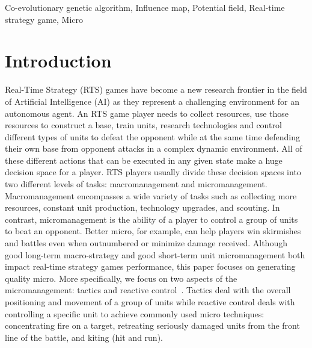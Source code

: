 \documentclass[conference,10pt]{IEEEtran}
\begin{document}
%
\begin{IEEEkeywords}
Co-evolutionary genetic algorithm, Influence map, Potential field, Real-time strategy game, Micro
\end{IEEEkeywords}
\vspace{-5pt}
%  
%
%
\section{Introduction}
\label{SectionIntroduction}

Real-Time Strategy (RTS) games have become a new research frontier in
the field of Artificial Intelligence (AI) as they represent a
challenging environment for an autonomous agent. An RTS game player
needs to collect resources, use those resources to construct a base,
train units, research technologies and control different types of
units to defeat the opponent while at the same time defending their
own base from opponent attacks in a complex dynamic environment. All
of these different actions that can be executed in any given state
make a huge decision space for a player. RTS players usually divide
these decision spaces into two different levels of tasks:
macromanagement and micromanagement. Macromanagement encompasses a
wide variety of tasks such as collecting more resources, constant unit
production, technology upgrades, and scouting. In contrast,
micromanagement is the ability of a player to control a group of units
to beat an opponent. Better micro, for example, can help players win
skirmishes and battles even when outnumbered or minimize damage
received. Although good long-term macro-strategy and good short-term
unit micromanagement both impact real-time strategy games performance,
this paper focuses on generating quality micro.  More specifically, we
focus on two aspects of the micromanagement: tactics and reactive
control~\cite{ASORSGARACIS13}. Tactics deal with the overall
positioning and movement of a group of units while reactive control
deals with controlling a specific unit to achieve commonly used micro
techniques: concentrating fire on a target, retreating seriously
damaged units from the front line of the battle, and kiting (hit and
run).
\end{document}
